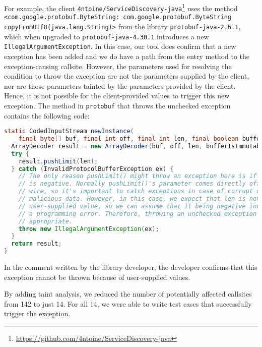 For example, the client \texttt{4ntoine/ServiceDiscovery-java}\footnote{\url{https://github.com/4ntoine/ServiceDiscovery-java}} uses the method \texttt{<com.google.protobuf.ByteString: com.google.protobuf.ByteString copyFromUtf8(java.lang.String)>}
from the library \texttt{protobuf-java-2.6.1}, which when upgraded to \texttt{protobuf-java-4.30.1} introduces a new \texttt{IllegalArgumentException}. In this case, our tool
does confirm that a new exception has been added and we do have a path from the entry method to the exception-causing callsite. However, the
parameters used for resolving the condition to throw the exception are not the parameters supplied by the client, nor
are those parameters tainted by the parameters provided by the client. Hence, it is not possible for the client-provided values
to trigger this new exception. The method in \texttt{protobuf} that throws the unchecked exception contains the following code:

\begin{lstlisting}[language=Java,breaklines=true,basicstyle=\scriptsize\ttfamily]
static CodedInputStream newInstance(
    final byte[] buf, final int off, final int len, final boolean bufferIsImmutable) {
  ArrayDecoder result = new ArrayDecoder(buf, off, len, bufferIsImmutable);
  try {
    result.pushLimit(len);
  } catch (InvalidProtocolBufferException ex) {
    // The only reason pushLimit() might throw an exception here is if len
    // is negative. Normally pushLimit()'s parameter comes directly off the
    // wire, so it's important to catch exceptions in case of corrupt or
    // malicious data. However, in this case, we expect that len is not a
    // user-supplied value, so we can assume that it being negative indicates
    // a programming error. Therefore, throwing an unchecked exception is
    // appropriate.
    throw new IllegalArgumentException(ex);
  }
  return result;
}
\end{lstlisting}

In the comment written by the library developer, the developer confirms that this exception cannot be thrown because of
user-supplied values.

\vspace{1em}
\begin{tcolorbox}[colback=gray!10, colframe=black]
By adding taint analysis, we reduced the number of potentially affected callsites from 142 to just 14. For all 14, we were able to write test cases that successfully trigger the exception.
\end{tcolorbox}
\vspace{1em}


